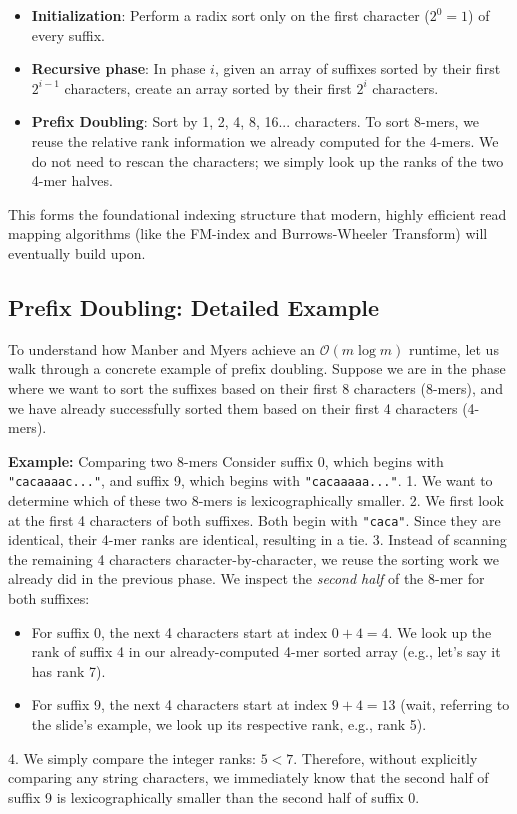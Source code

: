 \begin{itemize}
    \item \textbf{Initialization}: Perform a radix sort only on the first character ($2^0 = 1$) of every suffix.
    \item \textbf{Recursive phase}: In phase $i$, given an array of suffixes sorted by their first $2^{i-1}$ characters, create an array sorted by their first $2^i$ characters.
    \item \textbf{Prefix Doubling}: Sort by 1, 2, 4, 8, 16... characters. To sort 8-mers, we reuse the relative rank information we already computed for the 4-mers. We do not need to rescan the characters; we simply look up the ranks of the two 4-mer halves.
\end{itemize}

This forms the foundational indexing structure that modern, highly efficient read mapping algorithms (like the FM-index and Burrows-Wheeler Transform) will eventually build upon.

\subsection{Prefix Doubling: Detailed Example}

To understand how Manber and Myers achieve an $\mathcal{O}(m \log m)$ runtime, let us walk through a concrete example of prefix doubling. Suppose we are in the phase where we want to sort the suffixes based on their first 8 characters (8-mers), and we have already successfully sorted them based on their first 4 characters (4-mers).

\textbf{Example:} Comparing two 8-mers
Consider suffix 0, which begins with \texttt{"cacaaaac..."}, and suffix 9, which begins with \texttt{"cacaaaaa..."}. 
1. We want to determine which of these two 8-mers is lexicographically smaller.
2. We first look at the first 4 characters of both suffixes. Both begin with \texttt{"caca"}. Since they are identical, their 4-mer ranks are identical, resulting in a tie.
3. Instead of scanning the remaining 4 characters character-by-character, we reuse the sorting work we already did in the previous phase. We inspect the \textit{second half} of the 8-mer for both suffixes:
   \begin{itemize}
       \item For suffix 0, the next 4 characters start at index $0 + 4 = 4$. We look up the rank of suffix 4 in our already-computed 4-mer sorted array (e.g., let's say it has rank 7).
       \item For suffix 9, the next 4 characters start at index $9 + 4 = 13$ (wait, referring to the slide's example, we look up its respective rank, e.g., rank 5).
   \end{itemize}
4. We simply compare the integer ranks: $5 < 7$. Therefore, without explicitly comparing any string characters, we immediately know that the second half of suffix 9 is lexicographically smaller than the second half of suffix 0. 

